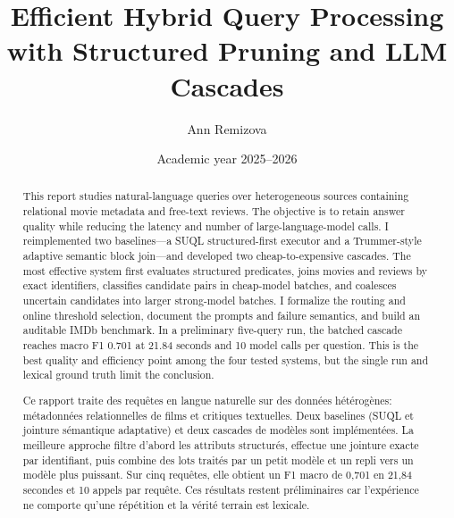 \documentclass[12pt,a4paper]{memoir}
\title{Efficient Hybrid Query Processing with Structured Pruning and LLM Cascades}
\author{Ann Remizova}
\date{Academic year 2025--2026}
\begin{document}
\frontmatter
\begin{titlingpage}\maketitle\end{titlingpage}
\renewcommand{\abstracttextfont}{\normalfont}\abstractintoc
\begin{abstract}
This report studies natural-language queries over heterogeneous sources containing
relational movie metadata and free-text reviews. The objective is to retain answer
quality while reducing the latency and number of large-language-model calls. I
reimplemented two baselines---a SUQL structured-first executor and a Trummer-style
adaptive semantic block join---and developed two cheap-to-expensive cascades. The
most effective system first evaluates structured predicates, joins movies and
reviews by exact identifiers, classifies candidate pairs in cheap-model batches,
and coalesces uncertain candidates into larger strong-model batches. I formalize
the routing and online threshold selection, document the prompts and failure
semantics, and build an auditable IMDb benchmark. In a preliminary five-query run,
the batched cascade reaches macro F1 0.701 at 21.84 seconds and 10 model calls per
question. This is the best quality and efficiency point among the four tested
systems, but the single run and lexical ground truth limit the conclusion.
\end{abstract}
\renewcommand\abstractname{R\'esum\'e}
\begin{abstract}
Ce rapport traite des requ\^etes en langue naturelle sur des donn\'ees h\'et\'erog\`enes:
m\'etadonn\'ees relationnelles de films et critiques textuelles. Deux baselines
(SUQL et jointure s\'emantique adaptative) et deux cascades de mod\`eles sont
impl\'ement\'ees. La meilleure approche filtre d'abord les attributs structur\'es,
effectue une jointure exacte par identifiant, puis combine des lots trait\'es par
un petit mod\`ele et un repli vers un mod\`ele plus puissant. Sur cinq requ\^etes,
elle obtient un F1 macro de 0,701 en 21,84 secondes et 10 appels par requ\^ete.
Ces r\'esultats restent pr\'eliminaires car l'exp\'erience ne comporte qu'une
r\'ep\'etition et la v\'erit\'e terrain est lexicale.
\end{abstract}
\tableofcontents*\mainmatter\SingleSpace







\backmatter
\end{document}
